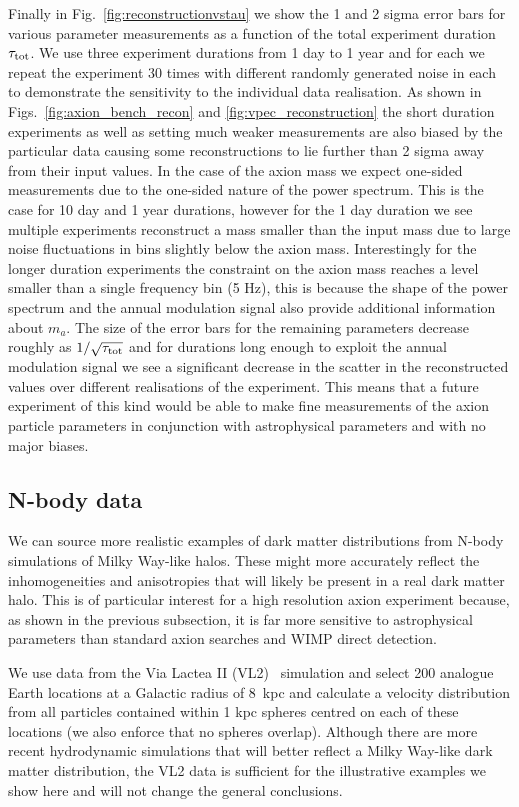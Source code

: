 Finally in Fig.~\ref{fig:reconstructionvstau} we show the 1 and 2 sigma error bars for various parameter measurements as a function of the total experiment duration $\tau_{\rm tot}$. We use three experiment durations from 1 day to 1 year and for each we repeat the experiment 30 times with different randomly generated noise in each to demonstrate the sensitivity to the individual data realisation. As shown in Figs.~\ref{fig:axion_bench_recon} and \ref{fig:vpec_reconstruction} the short duration experiments as well as setting much weaker measurements are also biased by the particular data causing some reconstructions to lie further than 2 sigma away from their input values. In the case of the axion mass we expect one-sided measurements due to the one-sided nature of the power spectrum. This is the case for 10 day and 1 year durations, however for the 1 day duration we see multiple experiments reconstruct a mass smaller than the input mass due to large noise fluctuations in bins slightly below the axion mass. Interestingly for the longer duration experiments the constraint on the axion mass reaches a level smaller than a single frequency bin (5 Hz), this is because the shape of the power spectrum and the annual modulation signal also provide additional information about $m_a$. The size of the error bars for the remaining parameters decrease roughly as $1/\sqrt{\tau_{\rm tot}}$ and for durations long enough to exploit the annual modulation signal we see a significant decrease in the scatter in the reconstructed values over different realisations of the experiment. This means that a future experiment of this kind would be able to make fine measurements of the axion particle parameters in conjunction with astrophysical parameters and with no major biases.


\subsection{N-body data}\label{sec:axions_nbody}
We can source more realistic examples of dark matter distributions from N-body simulations of Milky Way-like halos. These might more accurately reflect the inhomogeneities and anisotropies that will likely be present in a real dark matter halo. This is of particular interest for a high resolution axion experiment because, as shown in the previous subsection, it is far more sensitive to astrophysical parameters than standard axion searches and WIMP direct detection. 

We use data from the Via Lactea II (VL2)~\cite{Diemand:2007qr} simulation and select 200 analogue Earth locations at a Galactic radius of 8~kpc and calculate a velocity distribution from all particles contained within 1 kpc spheres centred on each of these locations (we also enforce that no spheres overlap). Although there are more recent hydrodynamic simulations that will better reflect a Milky Way-like dark matter distribution, the VL2 data is sufficient for the illustrative examples we show here and will not change the general conclusions.

